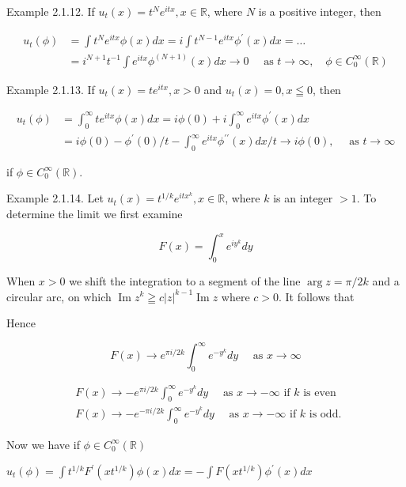 Example 2.1.12. If $u_{t}(x)=t^{N} e^{i t x}, x \in \mathbb{R}$, where $N$ is a positive integer, then

\[
\begin{aligned}
u_{t}(\phi) & =\int t^{N} e^{i t x} \phi(x) d x=i \int t^{N-1} e^{i t x} \phi^{\prime}(x) d x=\ldots \\
& =i^{N+1} t^{-1} \int e^{i t x} \phi^{(N+1)}(x) d x \rightarrow 0 \quad \text { as } t \rightarrow \infty, \quad \phi \in C_{0}^{\infty}(\mathbb{R})
\end{aligned}
\]

Example 2.1.13. If $u_{t}(x)=t e^{i t x}, x>0$ and $u_{t}(x)=0, x \leqq 0$, then

\[
\begin{aligned}
u_{t}(\phi) & =\int_{0}^{\infty} t e^{i t x} \phi(x) d x=i \phi(0)+i \int_{0}^{\infty} e^{i t x} \phi^{\prime}(x) d x \\
& =i \phi(0)-\phi^{\prime}(0) / t-\int_{0}^{\infty} e^{i t x} \phi^{\prime \prime}(x) d x / t \rightarrow i \phi(0), \quad \text { as } t \rightarrow \infty
\end{aligned}
\]

if $\phi \in C_{0}^{\infty}(\mathbb{R})$.

Example 2.1.14. Let $u_{t}(x)=t^{1 / k} e^{i t x^{k}}, x \in \mathbb{R}$, where $k$ is an integer $>1$. To determine the limit we first examine

\[
F(x)=\int_{0}^{x} e^{i y^{k}} d y
\]

When $x>0$ we shift the integration to a segment of the line $\arg z=\pi / 2 k$ and a circular arc, on which $\operatorname{Im} z^{k} \geqq c|z|^{k-1} \operatorname{Im} z$ where $c>0$. It follows that

Hence

\[
F(x) \rightarrow e^{\pi i / 2 k} \int_{0}^{\infty} e^{-y^{k}} d y \quad \text { as } x \rightarrow \infty
\]

\[
\begin{aligned}
& F(x) \rightarrow-e^{\pi i / 2 k} \int_{0}^{\infty} e^{-y^{k}} d y \quad \text { as } x \rightarrow-\infty \text { if } k \text { is even } \\
& F(x) \rightarrow-e^{-\pi i / 2 k} \int_{0}^{\infty} e^{-y^{k}} d y \quad \text { as } x \rightarrow-\infty \text { if } k \text { is odd. }
\end{aligned}
\]

Now we have if $\phi \in C_{0}^{\infty}(\mathbb{R})$

$u_{t}(\phi)=\int t^{1 / k} F^{\prime}\left(x t^{1 / k}\right) \phi(x) d x=-\int F\left(x t^{1 / k}\right) \phi^{\prime}(x) d x$

